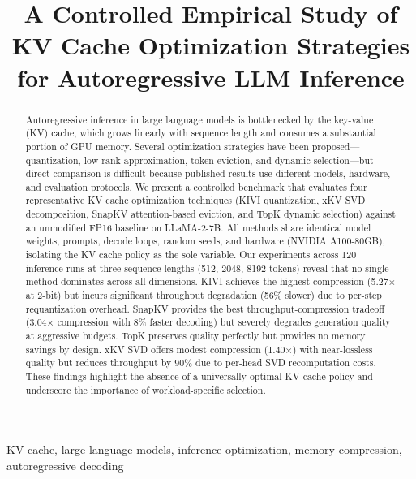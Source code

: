 \documentclass[conference]{IEEEtran}
\begin{document}
\title{A Controlled Empirical Study of KV Cache Optimization Strategies for Autoregressive LLM Inference}

\author{
}

\maketitle

\begin{abstract}
Autoregressive inference in large language models is bottlenecked by the key-value (KV) cache, which grows linearly with sequence length and consumes a substantial portion of GPU memory. Several optimization strategies have been proposed---quantization, low-rank approximation, token eviction, and dynamic selection---but direct comparison is difficult because published results use different models, hardware, and evaluation protocols. We present a controlled benchmark that evaluates four representative KV cache optimization techniques (KIVI quantization, xKV SVD decomposition, SnapKV attention-based eviction, and TopK dynamic selection) against an unmodified FP16 baseline on LLaMA-2-7B. All methods share identical model weights, prompts, decode loops, random seeds, and hardware (NVIDIA A100-80GB), isolating the KV cache policy as the sole variable. Our experiments across 120 inference runs at three sequence lengths (512, 2048, 8192 tokens) reveal that no single method dominates across all dimensions. KIVI achieves the highest compression (5.27$\times$ at 2-bit) but incurs significant throughput degradation (56\% slower) due to per-step requantization overhead. SnapKV provides the best throughput-compression tradeoff (3.04$\times$ compression with 8\% faster decoding) but severely degrades generation quality at aggressive budgets. TopK preserves quality perfectly but provides no memory savings by design. xKV SVD offers modest compression (1.40$\times$) with near-lossless quality but reduces throughput by 90\% due to per-head SVD recomputation costs. These findings highlight the absence of a universally optimal KV cache policy and underscore the importance of workload-specific selection.
\end{abstract}

\begin{IEEEkeywords}
KV cache, large language models, inference optimization, memory compression, autoregressive decoding
\end{IEEEkeywords}
\end{document}
